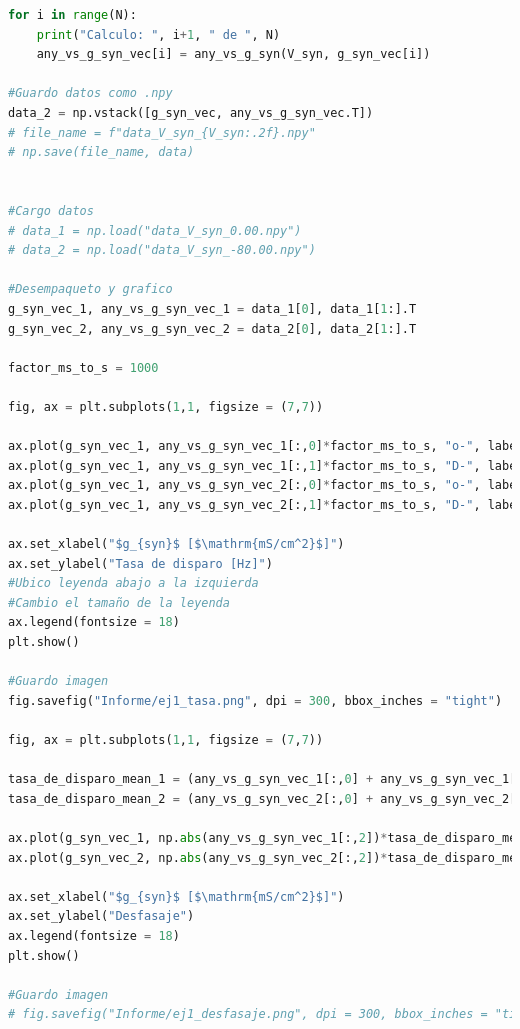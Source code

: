 \documentclass[aps,prb,twocolumn,superscriptaddress,floatfix,longbibliography]{revtex4-2}
\begin{document}
\begin{lstlisting}[language=Python]
for i in range(N):
    print("Calculo: ", i+1, " de ", N)
    any_vs_g_syn_vec[i] = any_vs_g_syn(V_syn, g_syn_vec[i])

#Guardo datos como .npy
data_2 = np.vstack([g_syn_vec, any_vs_g_syn_vec.T])
# file_name = f"data_V_syn_{V_syn:.2f}.npy"
# np.save(file_name, data)


#Cargo datos
# data_1 = np.load("data_V_syn_0.00.npy")
# data_2 = np.load("data_V_syn_-80.00.npy")

#Desempaqueto y grafico
g_syn_vec_1, any_vs_g_syn_vec_1 = data_1[0], data_1[1:].T
g_syn_vec_2, any_vs_g_syn_vec_2 = data_2[0], data_2[1:].T

factor_ms_to_s = 1000

fig, ax = plt.subplots(1,1, figsize = (7,7))

ax.plot(g_syn_vec_1, any_vs_g_syn_vec_1[:,0]*factor_ms_to_s, "o-", label = r"$V_1$ - $V_{syn}$ = 0 mV", alpha = 0.5, color = "tab:blue")
ax.plot(g_syn_vec_1, any_vs_g_syn_vec_1[:,1]*factor_ms_to_s, "D-", label = r"$V_2$ - $V_{syn}$ = 0 mV", alpha = 0.5, color = "tab:cyan")
ax.plot(g_syn_vec_1, any_vs_g_syn_vec_2[:,0]*factor_ms_to_s, "o-", label = r"$V_1$ - $V_{syn}$ = -80 mV", alpha = 0.5, color = "tab:red")
ax.plot(g_syn_vec_1, any_vs_g_syn_vec_2[:,1]*factor_ms_to_s, "D-", label = r"$V_2$ - $V_{syn}$ = -80 mV", alpha = 0.5, color = "tab:orange")

ax.set_xlabel("$g_{syn}$ [$\mathrm{mS/cm^2}$]")
ax.set_ylabel("Tasa de disparo [Hz]")
#Ubico leyenda abajo a la izquierda
#Cambio el tamaño de la leyenda
ax.legend(fontsize = 18)
plt.show()

#Guardo imagen
fig.savefig("Informe/ej1_tasa.png", dpi = 300, bbox_inches = "tight")

fig, ax = plt.subplots(1,1, figsize = (7,7))

tasa_de_disparo_mean_1 = (any_vs_g_syn_vec_1[:,0] + any_vs_g_syn_vec_1[:,1])/2
tasa_de_disparo_mean_2 = (any_vs_g_syn_vec_2[:,0] + any_vs_g_syn_vec_2[:,1])/2

ax.plot(g_syn_vec_1, np.abs(any_vs_g_syn_vec_1[:,2])*tasa_de_disparo_mean_1, "o-", label = "$V_{syn}$ = 0 mV", color = "tab:cyan")
ax.plot(g_syn_vec_2, np.abs(any_vs_g_syn_vec_2[:,2])*tasa_de_disparo_mean_2, "o-", label = "$V_{syn}$ = -80 mV", color = "tab:orange")

ax.set_xlabel("$g_{syn}$ [$\mathrm{mS/cm^2}$]")
ax.set_ylabel("Desfasaje")
ax.legend(fontsize = 18)
plt.show()

#Guardo imagen
# fig.savefig("Informe/ej1_desfasaje.png", dpi = 300, bbox_inches = "tight")

\end{lstlisting}
    

% 
\end{document}
